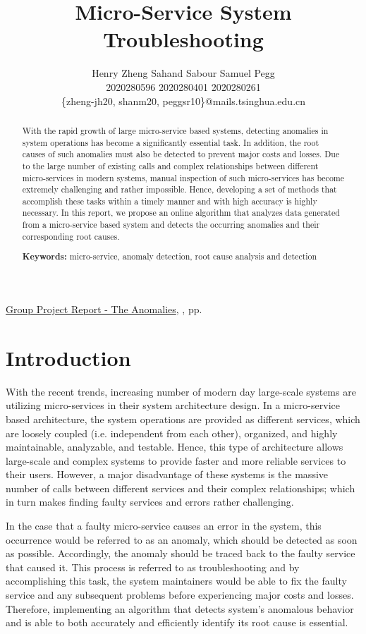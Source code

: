 \documentclass[12pt]{article}
\title{Micro-Service System Troubleshooting}
\author{
Henry Zheng\hspace{0.6cm} Sahand Sabour\hspace{0.6cm}  Samuel Pegg\\
2020280596 \hspace{0.95cm}2020280401  \hspace{0.95cm}2020280261\\
 \{zheng-jh20, shanm20, peggsr10\}@mails.tsinghua.edu.cn
}
\date{} %
\newcommand{\jhead}{Group Project Report - The Anomalies}
\begin{document}
\begin{htmlonly}
\href{\jref}{\jhead}, \jdate, pp.\
\end{htmlonly}

\maketitle
\thispagestyle{first-page}

\begin{abstract}
\noindent With the rapid growth of large micro-service based systems, detecting anomalies in system operations has become a significantly essential task. In addition, the root causes of such anomalies must also be detected to prevent major costs and losses. Due to the large number of existing calls and complex relationships between different micro-services in modern systems, manual inspection of such micro-services has become extremely challenging and rather impossible. Hence, developing a set of methods that accomplish these tasks within a timely manner and with high accuracy is highly necessary. In this report, we propose an online algorithm that analyzes data generated from a micro-service based system and detects the occurring anomalies and their corresponding root causes.  

\smallskip
\noindent
\textbf{Keywords:} micro-service, anomaly detection, root cause analysis and detection
\end{abstract}


\section{Introduction}
With the recent trends, increasing number of modern day large-scale systems are utilizing micro-services in their system architecture design. In a micro-service based architecture, the system operations are provided as different services, which are loosely coupled (i.e. independent from each other), organized, and highly maintainable, analyzable, and testable. Hence, this type of architecture allows large-scale and complex systems to provide faster and more reliable services to their users. However, a major disadvantage of these systems is the massive number of calls between different services and their complex relationships; which in turn makes finding faulty services and errors rather challenging.

\noindent In the case that a faulty micro-service causes an error in the system, this occurrence would be referred to as an anomaly, which should be detected as soon as possible. Accordingly, the anomaly should be traced back to the faulty service that caused it. This process is referred to as troubleshooting and by accomplishing this task, the system maintainers would be able to fix the faulty service and any subsequent problems before experiencing major costs and losses. Therefore, implementing an algorithm that detects system's anomalous behavior and is able to both accurately and efficiently identify its root cause is essential.
\end{document}
